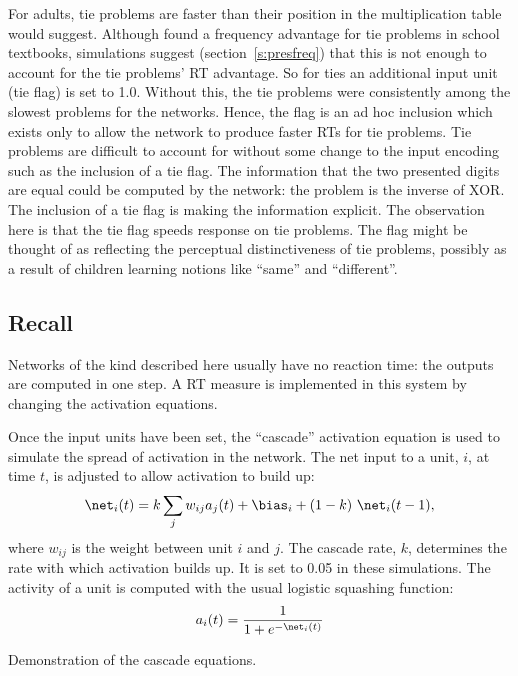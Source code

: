 For adults, tie problems are faster than their position in the
multiplication table would suggest. Although  found a
frequency advantage for tie problems in school textbooks, simulations
suggest (section~\ref{s:presfreq}) that this is not enough to account for
the tie problems' RT advantage.  So for ties an additional input unit (tie
flag) is set to 1.0. Without this, the tie problems were consistently among
the slowest problems for the networks. Hence, the flag is an ad hoc
inclusion which exists only to allow the network to produce faster RTs for
tie problems.
Tie problems are difficult to account for without some change
to the input encoding such as the inclusion of a tie flag.
The information that the two presented digits are equal could be computed
by the network: the problem is the inverse of XOR\@.
The inclusion of a tie flag is making the information
explicit.  The observation here is that the tie flag speeds
response on tie problems. The flag might
be thought of as reflecting the perceptual distinctiveness of tie problems,
possibly as a result of children learning notions like ``same'' and
``different''.


\subsection{Recall}

Networks of the kind described here usually have no reaction time: the
outputs are computed in one step.  A RT measure is implemented in this
system by changing the activation equations.

Once the input units have been set, the ``cascade'' activation equation
\cite[p.~153]{pdp3} is used to simulate the spread of activation in the
network.  The net input to a unit, $i$, at time $t$, is
adjusted to allow activation to build up:
$$ \net_i(t) = k \sum\limits_j w_{ij} a_j(t)
+ \bias_i + (1-k)\ \net_i(t-1), $$
\noindent where $w_{ij}$ is the weight between unit $i$ and $j$.
The cascade rate, $k$, determines the rate with which activation
builds up.  It is set to 0.05 in these simulations.  The activity of a
unit is computed with the usual logistic squashing function:
$$ a_i(t) = \frac{1}{1 + e^{-\net_{i}(t)}} $$

\begin{fancyfigure}
\centerline{}
\caption{Demonstration of the cascade equations.}
\label{f:cascade}
\end{fancyfigure}

